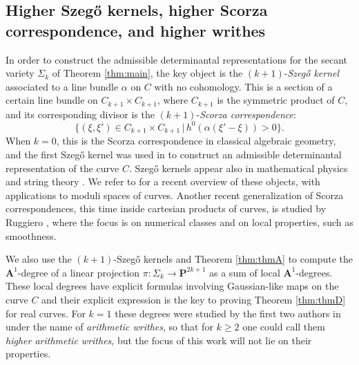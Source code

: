 \documentclass[12pt]{amsart}
\numberwithin{equation}{section}
\numberwithin{thmcounter}{section}
\theoremstyle{definition}
\theoremstyle{claim}
\newcommand{\nP}{\mathbf{P}}
\newcommand{\nA}{\mathbf{A}}
\begin{document}
\subsection{Higher Szeg\H{o} kernels, higher Scorza correspondence, and higher writhes}

 In order to construct the admissible determinantal representations for the secant variety $\Sigma_k$ of Theorem \ref{thm:main}, the key object is the $(k+1)$-\emph{Szeg\H{o} kernel} associated to a line bundle $\alpha$ on $C$ with no cohomology. This is a section of a certain line bundle on $C_{k+1}\times C_{k+1}$, where $C_{k+1}$ is the symmetric product of $C$, and its corresponding divisor is the $(k+1)$-\emph{Scorza correspondence}:
\[ \{ (\xi,\xi') \in C_{k+1}\times C_{k+1} \,|\, h^0(\alpha(\xi'-\xi))>0 \}. \]
When $k=0$, this is the Scorza correspondence in classical algebraic geometry, and the first Szeg\H{o} kernel was used in \cite{shamovichvinnikov} to construct an admissible determinantal representation of the curve $C$. Szeg\H{o}  kernels  appear also in mathematical physics \cite{Fay,raina} and string theory \cite{DHP,Wi}. We refer to \cite{FI} for a recent overview of these objects, with applications to moduli spaces of curves. Another recent generalization of Scorza correspondences, this time inside cartesian products of curves, is studied by Ruggiero \cite{ruggiero}, where the focus is on numerical classes and on local properties, such as smoothness.

\medskip

 We also use the $(k+1)$-Szeg\H{o} kernels and  Theorem \ref{thm:thmA} to compute the  $\nA^1$-degree of a linear projection $\pi\colon \Sigma_k \rightarrow \nP^{2k+1}$ as a sum of  local $\nA^1$-degrees. These local degrees have explicit formulas involving Gaussian-like maps on the curve $C$ and their explicit expression is the key to proving Theorem \ref{thm:thmD} for real curves. For $k=1$ these degrees were studied by the first two authors in \cite{agostinikummer} under the name of \emph{arithmetic writhes}, so that for $k\geq2$ one could call them \emph{higher arithmetic writhes}, but the focus of this work will not lie on their properties.
 
\end{document}
